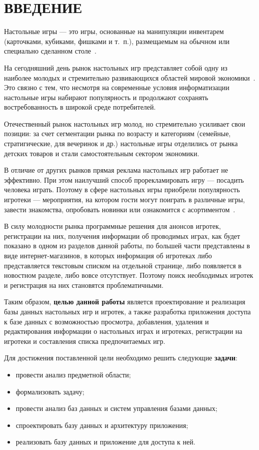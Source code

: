 \chapter*{ВВЕДЕНИЕ}

Настольные игры --- это игры, основанные на манипуляции инвентарем (карточками,
кубиками, фишками и т.~п.), размещаемым на обычном или специально сделанном
столе~\cite{art01}.

На сегодняшний день рынок настольных игр представляет собой одну из наиболее
молодых и стремительно развивающихся областей мировой
экономики~\cite{art02}. Это связно с тем, что несмотря на современные условия
информатизации настольные игры набирают популярность и продолжают сохранять
востребованность в широкой среде потребителей.

Отечественный рынок настольных игр молод, но стремительно усиливает свои
позиции: за счет сегментации рынка по возрасту и категориям (семейные,
стратигические, для вечеринок и др.) настольные игры отделились от рынка
детских товаров и стали самостоятельным сектором экономики.

В отличие от других рынков прямая реклама настольных игр работает не эффективно.
При этом наилучший способ прорекламировать игру --- посадить человека играть.
Поэтому в сфере настольных игры приобрели популярность игротеки --- мероприятия,
на котором гости могут поиграть в различные игры, завести знакомства, опробовать
новинки или ознакомится с асортиментом~\cite{art03}.

В силу молодности рынка программные решения для анонсов игротек, регистрации на
них, получения информации об проводимых играх, как будет показано в одном из
разделов данной работы, по большей части представлены в виде интернет-магазинов,
в которых информация об игротеках либо представляется текстовым списком на
отдельной странице, либо появляется в новостном разделе, либо вовсе отсутствует.
Поэтому поиск необходимых игротек и регистрация на них становятся
проблематичными.

Таким образом, \textbf{целью данной работы} является проектирование и реализация
базы данных настольных игр и игротек, а также разработка приложения доступа к
базе данных с возможностью просмотра, добавления, удаления и редактирования
информации о настольных играх и игротеках, регистрации на игротеки и составления
списка предпочитаемых игр.

Для достижения поставленной цели необходимо решить следующие \textbf{задачи}:
\begin{itemize}[left=\parindent]
    \item провести анализ предметной области;
    \item формализовать задачу;
    \item провести анализ баз данных и систем управления базами данных;
    \item спроектировать базу данных и архитектуру приложения;
    \item реализовать базу данных и приложение для доступа к ней.
\end{itemize}


